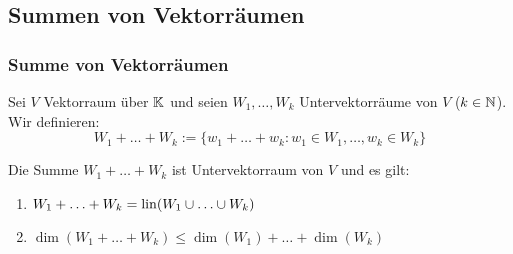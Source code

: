 \clearpage
\subsection{Summen von Vektorräumen}
\subsubsection{Summe von Vektorräumen}
Sei $ V $ Vektorraum über $ \mathbb K $ und seien $ W_1, \ldots , W_k $ Untervektorräume von $ V $ ($ k \in \mathbb N $). Wir definieren:
\begin{equation}
	W_1 + \ldots + W_k := \{ w_1 + \ldots + w_k : w_1 \in W_1, \ldots, w_k \in W_k \}
\end{equation}
\begin{bem}
	Die Summe $ W_1 + \ldots + W_k $ ist Untervektorraum von $ V $ und es gilt:
	\begin{enumerate}
		\item
			$ W_1 + \ldots + W_k = \operatorname{lin}( W_1 \cup \ldots \cup W_k ) $
		\item
			$ \dim(W_1 + \ldots + W_k) \leq \dim(W_1) + \ldots + \dim(W_k) $
	\end{enumerate}
\end{bem}

